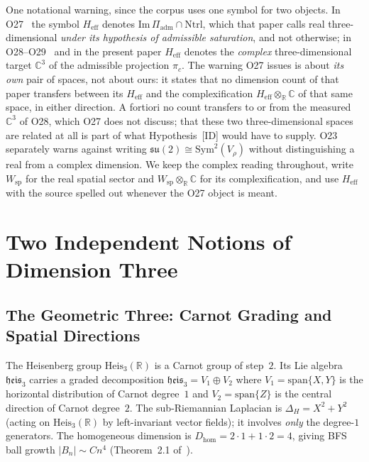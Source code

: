 \documentclass[11pt,a4paper]{article}
\newcommand{\Heis}{\mathrm{Heis}_3}
\newcommand{\Heff}{H_{\mathrm{eff}}}
\newcommand{\su}{\mathfrak{su}}
\newcommand{\heis}{\mathfrak{heis}_3}
\newcommand{\Vr}{V_\rho}
\newcommand{\Dhom}{D_{\mathrm{hom}}}
\newcommand{\Sym}{\mathrm{Sym}}
\begin{document}
    One notational warning, since the corpus uses one symbol for two objects.
    In O27~\cite{Beau2026a31} the symbol $H_{\mathrm{eff}}$ denotes
    $\mathrm{Im}\,\Pi_{\mathrm{adm}} \cap \mathrm{Ntrl}$, which that paper calls real
    three-dimensional \emph{under its hypothesis of admissible saturation}, and not otherwise;
    in O28--O29~\cite{Beau2026a32,Beau2026a33} and in the present paper $\Heff$ denotes the
    \emph{complex} three-dimensional target $\mathbb{C}^3$ of the admissible projection $\pi_c$.
    The warning O27 issues is about \emph{its own} pair of spaces, not about ours: it states that
    no dimension count of that paper transfers between its $H_{\mathrm{eff}}$ and the
    complexification $H_{\mathrm{eff}} \otimes_\mathbb{R} \mathbb{C}$ of that same space, in
    either direction.
    A fortiori no count transfers to or from the measured $\mathbb{C}^3$ of O28, which O27 does not
    discuss; that these two three-dimensional spaces are related at all is part of what
    Hypothesis~[ID] would have to supply.
    O23~\cite{Beau2026a27} separately warns against writing $\su(2) \cong \Sym^2(\Vr)$ without
    distinguishing a real from a complex dimension.
    We keep the complex reading throughout, write $W_{\mathrm{sp}}$ for the real spatial sector and
    $W_{\mathrm{sp}} \otimes_\mathbb{R} \mathbb{C}$ for its complexification, and use
    $H_{\mathrm{eff}}$ with the source spelled out whenever the O27 object is meant.

  \section{Two Independent Notions of Dimension Three}

  \subsection{The Geometric Three: Carnot Grading and Spatial Directions}
    \label{sec:geom3}

    The Heisenberg group $\Heis(\mathbb{R})$ is a Carnot group of step~$2$.
    Its Lie algebra $\heis$ carries a graded decomposition $\heis = V_1 \oplus V_2$ where
    $V_1 = \mathrm{span}\{X, Y\}$ is the horizontal distribution of Carnot degree~$1$ and
    $V_2 = \mathrm{span}\{Z\}$ is the central direction of Carnot degree~$2$.
    The sub-Riemannian Laplacian is $\Delta_H = X^2 + Y^2$ (acting on $\Heis(\mathbb{R})$
    by left-invariant vector fields); it involves \emph{only} the degree-$1$ generators.
    The homogeneous dimension is $\Dhom = 2 \cdot 1 + 1 \cdot 2 = 4$, giving BFS ball growth
    $|B_n| \sim C n^4$ (Theorem~2.1 of~\cite{Beau2026q5b}).
\end{document}
